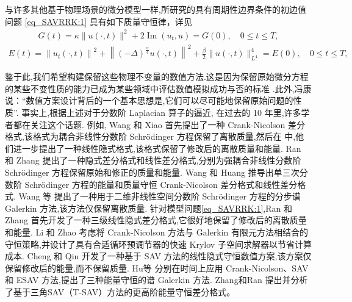
与许多其他基于物理场景的微分模型一样,所研究的具有周期性边界条件的初边值问题 \eqref{eq_SAVRRK:1}  具有如下质量守恒律，详见 \cite{baoUniformErrorEstimates2012,ranLinearlyImplicitConservative2016}
\begin{align}\label{eq_PAVF:_8}
    G(t)=\kappa\|u(\cdot, t)\|^{2}+2\operatorname{Im}\left(u_{t}, u\right)=G(0), \quad 0 \leq t \leq T,
    \end{align}
    \begin{align}\label{eq_SAVRRK:9}
        E(t)=\left\|u_{t}(\cdot, t)\right\|^{2}+\left\|(-\Delta)^{\frac{\alpha}{4}} u(\cdot, t)\right\|^{2}+\frac{\beta}{2}\|u(\cdot, t)\|_{L^{4}}^{4}=E(0), \quad 0 \leq t \leq T,
        \end{align}

鉴于此,我们希望构建保留这些物理不变量的数值方法.这是因为保留原始微分方程的某些不变性质的能力已成为某些领域中评估数值模拟成功与否的标准 \cite{liFiniteDifferenceCalculus1995}.此外,冯康说：“数值方案设计背后的一个基本思想是,它们可以尽可能地保留原始问题的性质”.
事实上,根据上述对于分数阶 Laplacian 算子的逼近, 在过去的 10 年里,许多学者都在关注这个话题. 
例如, Wang 和 Xiao \cite{wangCrankNicolsonDifference2013} 首先提出了一种 Crank-Nicolson 差分格式,该格式为耦合非线性分数阶 Schr{\"o}dinger 方程保留了离散质量,然后在 \cite{wangLinearlyImplicitConservative2014} 中,他们进一步提出了一种线性隐式格式,该格式保留了修改后的离散质量和能量. 
Ran 和 Zhang \cite{ranConservativeDifferenceScheme2016} 提出了一种隐式差分格式和线性差分格式,分别为强耦合非线性分数阶 Schr{\"o}dinger 方程保留原始和修正的质量和能量. 
Wang 和 Huang \cite{wangEnergyConservativeDifference2015,wangConservativeLinearizedDifference2015} 推导出单三次分数阶 Schr{\"o}dinger 方程的能量和质量守恒 Crank-Nicolson 差分格式和线性差分格式.
Wang 等 \cite{wangSplitstepSpectralGalerkin2019} 提出了一种用于二维非线性空间分数阶 Schr{\"o}dinger 方程的分步谱 Galerkin 方法,该方法仅保留离散质量.
针对模型问题\eqref{eq_SAVRRK:1},Ran 和 Zhang \cite{ranLinearlyImplicitConservative2016} 首先开发了一种三级线性隐式差分格式,它很好地保留了修改后的离散质量和能量. 
Li 和 Zhao \cite{liFastEnergyConserving2018} 考虑将 Crank-Nicolson 方法与 Galerkin 有限元方法相结合的守恒策略,并设计了具有合适循环预调节器的快速 Krylov 子空间求解器以节省计算成本. 
Cheng 和 Qin \cite{chengConvergenceEnergyconservingScheme2022} 开发了一种基于 SAV 方法的线性隐式守恒数值方案,该方案仅保留修改后的能量,而不保留质量.
Hu等 \cite{huEfficientEnergyPreserving2022} 分别在时间上应用 Crank-Nicolson、SAV 和 ESAV 方法,提出了三种能量守恒的谱 Galerkin 方法.
Zhang和Ran \cite{zhangHighorderStructurepreservingDifference2023} 提出并分析了基于三角SAV（T-SAV）方法的更高阶能量守恒差分格式。

